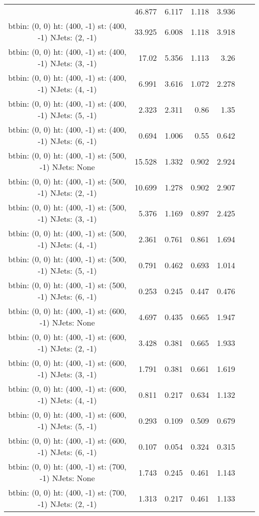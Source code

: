 \documentclass[12pt]{paper}
\begin{document}
\begin{landscape}
\begin{longtable}{c|r|r|r|r|r|r}
 & 46.877 & 6.117 & 1.118 & 3.936\\
btbin:  (0, 0) ht:  (400, -1) st:  (400, -1) NJets:  (2, -1)
 & 33.925 & 6.008 & 1.118 & 3.918\\
btbin:  (0, 0) ht:  (400, -1) st:  (400, -1) NJets:  (3, -1)
 & 17.02 & 5.356 & 1.113 & 3.26\\
btbin:  (0, 0) ht:  (400, -1) st:  (400, -1) NJets:  (4, -1)
 & 6.991 & 3.616 & 1.072 & 2.278\\
btbin:  (0, 0) ht:  (400, -1) st:  (400, -1) NJets:  (5, -1)
 & 2.323 & 2.311 & 0.86 & 1.35\\
btbin:  (0, 0) ht:  (400, -1) st:  (400, -1) NJets:  (6, -1)
 & 0.694 & 1.006 & 0.55 & 0.642\\
btbin:  (0, 0) ht:  (400, -1) st:  (500, -1) NJets:  None
 & 15.528 & 1.332 & 0.902 & 2.924\\
btbin:  (0, 0) ht:  (400, -1) st:  (500, -1) NJets:  (2, -1)
 & 10.699 & 1.278 & 0.902 & 2.907\\
btbin:  (0, 0) ht:  (400, -1) st:  (500, -1) NJets:  (3, -1)
 & 5.376 & 1.169 & 0.897 & 2.425\\
btbin:  (0, 0) ht:  (400, -1) st:  (500, -1) NJets:  (4, -1)
 & 2.361 & 0.761 & 0.861 & 1.694\\
btbin:  (0, 0) ht:  (400, -1) st:  (500, -1) NJets:  (5, -1)
 & 0.791 & 0.462 & 0.693 & 1.014\\
btbin:  (0, 0) ht:  (400, -1) st:  (500, -1) NJets:  (6, -1)
 & 0.253 & 0.245 & 0.447 & 0.476\\
btbin:  (0, 0) ht:  (400, -1) st:  (600, -1) NJets:  None
 & 4.697 & 0.435 & 0.665 & 1.947\\
btbin:  (0, 0) ht:  (400, -1) st:  (600, -1) NJets:  (2, -1)
 & 3.428 & 0.381 & 0.665 & 1.933\\
btbin:  (0, 0) ht:  (400, -1) st:  (600, -1) NJets:  (3, -1)
 & 1.791 & 0.381 & 0.661 & 1.619\\
btbin:  (0, 0) ht:  (400, -1) st:  (600, -1) NJets:  (4, -1)
 & 0.811 & 0.217 & 0.634 & 1.132\\
btbin:  (0, 0) ht:  (400, -1) st:  (600, -1) NJets:  (5, -1)
 & 0.293 & 0.109 & 0.509 & 0.679\\
btbin:  (0, 0) ht:  (400, -1) st:  (600, -1) NJets:  (6, -1)
 & 0.107 & 0.054 & 0.324 & 0.315\\
btbin:  (0, 0) ht:  (400, -1) st:  (700, -1) NJets:  None
 & 1.743 & 0.245 & 0.461 & 1.143\\
btbin:  (0, 0) ht:  (400, -1) st:  (700, -1) NJets:  (2, -1)
 & 1.313 & 0.217 & 0.461 & 1.133\\

\end{longtable}
\end{landscape}
\end{document}

